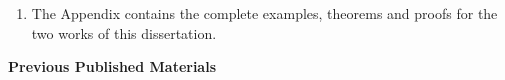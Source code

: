 \begin{enumerate}

    \item {}
    The Appendix contains the complete examples, theorems and proofs for the two works of this dissertation.
\end{enumerate}

\textbf{Previous Published Materials}